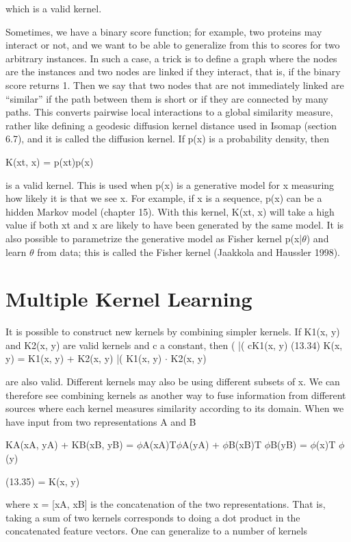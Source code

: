 which is a valid kernel.

Sometimes, we have a binary score function; for example, two proteins may interact or not, and we want to be able to generalize from this to scores for two arbitrary instances. In such a case, a trick is to define a graph where the nodes are the instances and two nodes are linked if they interact, that is, if the binary score returns 1. Then we say that two nodes that are not immediately linked are “similar” if the path between them is short or if they are connected by many paths. This converts pairwise local interactions to a global similarity measure, rather like defining a geodesic diffusion kernel distance used in Isomap (section 6.7), and it is called the diffusion kernel. If p(x) is a probability density, then

K(xt, x) = p(xt)p(x)

is a valid kernel. This is used when p(x) is a generative model for x measuring how likely it is that we see x. For example, if x is a sequence, p(x) can be a hidden Markov model (chapter 15). With this kernel, K(xt, x) will take a high value if both xt and x are likely to have been generated by the same model. It is also possible to parametrize the generative model as Fisher kernel p(x|$\theta$) and learn $\theta$ from data; this is called the Fisher kernel (Jaakkola and Haussler 1998).

\section{Multiple Kernel Learning}

It is possible to construct new kernels by combining simpler kernels. If K1(x, y) and K2(x, y) are valid kernels and c a constant, then ( |( cK1(x, y) (13.34) K(x, y) = K1(x, y) + K2(x, y) |( K1(x, y) $\cdot$ K2(x, y)

are also valid. Different kernels may also be using different subsets of x. We can therefore see combining kernels as another way to fuse information from different sources where each kernel measures similarity according to its domain. When we have input from two representations A and B

KA(xA, yA) + KB(xB, yB) = $\phi$A(xA)T$\phi$A(yA) + $\phi$B(xB)T $\phi$B(yB) = $\phi$(x)T $\phi$(y)

(13.35) = K(x, y)

where x = [xA, xB] is the concatenation of the two representations. That is, taking a sum of two kernels corresponds to doing a dot product in the concatenated feature vectors. One can generalize to a number of kernels

